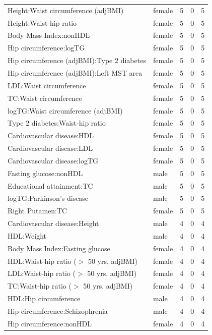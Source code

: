 \begin{table}[ht]
\begin{tabular}{llrrr}
  Height:Waist circumference (adjBMI) & female &   5 &   0 &   5 \\ 
  Height:Waist-hip ratio & female &   5 &   0 &   5 \\ 
  Body Mass Index:nonHDL & female &   5 &   0 &   5 \\ 
  Hip circumference:logTG & female &   5 &   0 &   5 \\ 
  Hip circumference (adjBMI):Type 2 diabetes & female &   5 &   0 &   5 \\ 
  Hip circumference (adjBMI):Left MST area & female &   5 &   0 &   5 \\ 
  LDL:Waist circumference & female &   5 &   0 &   5 \\ 
  TC:Waist circumference & female &   5 &   0 &   5 \\ 
  logTG:Waist circumference (adjBMI) & female &   5 &   0 &   5 \\ 
  Type 2 diabetes:Waist-hip ratio & female &   5 &   0 &   5 \\ 
  Cardiovascular disease:HDL & female &   5 &   0 &   5 \\ 
  Cardiovascular disease:LDL & female &   5 &   0 &   5 \\ 
  Cardiovascular disease:logTG & female &   5 &   0 &   5 \\ 
  Fasting glucose:nonHDL & male &   5 &   0 &   5 \\ 
  Educational attainment:TC & male &   5 &   0 &   5 \\ 
  logTG:Parkinson's disease & male &   5 &   0 &   5 \\ 
  Right Putamen:TC & female &   5 &   0 &   5 \\ 
  Cardiovascular disease:Height & male &   4 &   0 &   4 \\ 
  HDL:Weight & male &   4 &   0 &   4 \\ 
  Body Mass Index:Fasting glucose & female &   4 &   0 &   4 \\ 
  HDL:Waist-hip ratio ($>$ 50 yrs, adjBMI) & female &   4 &   0 &   4 \\ 
  LDL:Waist-hip ratio ($>$ 50 yrs, adjBMI) & female &   4 &   0 &   4 \\ 
  TC:Waist-hip ratio ($>$ 50 yrs, adjBMI) & female &   4 &   0 &   4 \\ 
  HDL:Hip circumference & male &   4 &   0 &   4 \\ 
  Hip circumference:Schizophrenia & male &   4 &   0 &   4 \\ 
  Hip circumference:nonHDL & female &   4 &   0 &   4 \\ 

\end{tabular}
\end{table}
